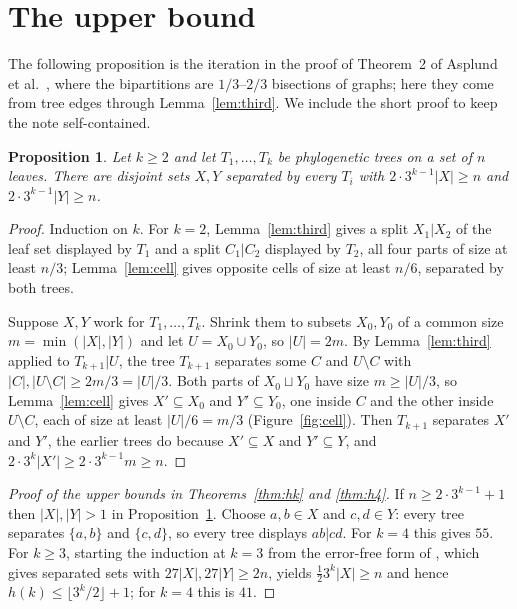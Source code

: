 \documentclass[11pt]{amsart}
\newtheorem{proposition}[theorem]{Proposition}
\theoremstyle{definition}
\begin{document}
\section{The upper bound}\label{sec:upper}

The following proposition is the iteration in the proof of Theorem~2 of Asplund et al.\ \cite{ADHSTW}, where the
bipartitions are $1/3$--$2/3$ bisections of graphs; here they come from tree edges through Lemma~\ref{lem:third}. We
include the short proof to keep the note self-contained.

\begin{proposition}\label{prop:upper}
Let $k\ge2$ and let $T_1,\dots,T_k$ be phylogenetic trees on a set of $n$ leaves. There are disjoint sets $X,Y$
separated by every $T_i$ with $2\cdot3^{k-1}|X|\ge n$ and $2\cdot3^{k-1}|Y|\ge n$.
\end{proposition}

\begin{proof}
Induction on $k$. For $k=2$, Lemma~\ref{lem:third} gives a split $X_1|X_2$ of the leaf set displayed by $T_1$ and a
split $C_1|C_2$ displayed by $T_2$, all four parts of size at least $n/3$; Lemma~\ref{lem:cell} gives opposite cells
of size at least $n/6$, separated by both trees.

Suppose $X,Y$ work for $T_1,\dots,T_{k}$. Shrink them to subsets $X_0,Y_0$ of a common size $m=\min(|X|,|Y|)$ and
let $U=X_0\cup Y_0$, so $|U|=2m$. By Lemma~\ref{lem:third} applied to $T_{k+1}|U$, the tree $T_{k+1}$ separates
some $C$ and $U\setminus C$ with $|C|,|U\setminus C|\ge 2m/3=|U|/3$. Both parts of $X_0\sqcup Y_0$ have size
$m\ge|U|/3$, so Lemma~\ref{lem:cell} gives $X'\subseteq X_0$ and $Y'\subseteq Y_0$, one inside $C$ and the other
inside $U\setminus C$, each of size at least $|U|/6=m/3$ (Figure~\ref{fig:cell}). Then $T_{k+1}$ separates $X'$ and
$Y'$, the earlier trees do because $X'\subseteq X$ and $Y'\subseteq Y$, and
$2\cdot3^{k}|X'|\ge 2\cdot3^{k-1}m\ge n$.
\end{proof}

\begin{proof}[Proof of the upper bounds in Theorems~\ref{thm:hk} and \ref{thm:h4}]
If $n\ge2\cdot3^{k-1}+1$ then $|X|,|Y|>1$ in Proposition~\ref{prop:upper}. Choose $a,b\in X$ and $c,d\in Y$: every
tree separates $\{a,b\}$ and $\{c,d\}$, so every tree displays $ab|cd$. For $k=4$ this gives $55$. For $k\ge3$,
starting the induction at $k=3$ from the error-free form of \cite[Theorem~1.3]{SY}, which gives separated sets with
$27|X|,27|Y|\ge 2n$, yields $\tfrac12 3^{k}|X|\ge n$ and hence $h(k)\le\lfloor 3^k/2\rfloor+1$; for $k=4$ this is
$41$.
\end{proof}
\end{document}

